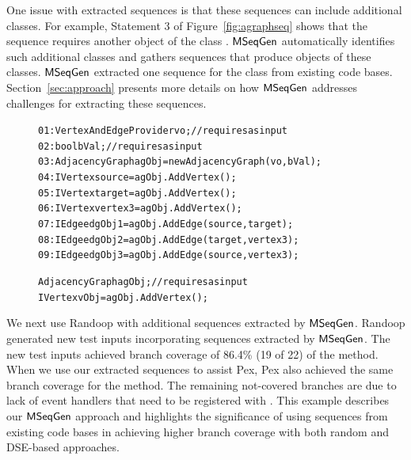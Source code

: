 \documentclass{sig-alternate}
\begin{document}
One issue with extracted sequences is that these sequences can include additional classes. For example,
Statement 3 of Figure~\ref{fig:agraphseq} shows that the  sequence requires another object of the class . $\textsf{MSeqGen} $ automatically identifies such additional classes and gathers sequences that produce objects of these classes. $\textsf{MSeqGen} $ extracted one  sequence for the  class from existing code bases. Section~\ref{sec:approach} presents more details on how $\textsf{MSeqGen} $ addresses challenges for extracting these sequences.

\begin{figure}[t]
\begin{CodeOut}
\begin{alltt}
01: VertexAndEdgeProvider vo; //requires as input
02: bool bVal; //requires as input
03: AdjacencyGraph agObj = new AdjacencyGraph(vo,bVal); 
04: IVertex source = agObj.AddVertex();
05: IVertex target = agObj.AddVertex();
06: IVertex vertex3 = agObj.AddVertex();
07: IEdge edgObj1 = agObj.AddEdge(source,target); 
08: IEdge edgObj2 = agObj.AddEdge(target,vertex3);
09: IEdge edgObj3 = agObj.AddEdge(source,vertex3);
\end{alltt}
\end{CodeOut}\vspace*{-4ex}
\vspace*{-2ex}
\end{figure}
\begin{figure}[t]
\begin{CodeOut}
\begin{alltt}
AdjacencyGraph agObj; //requires as input
IVertex vObj = agObj.AddVertex();
\end{alltt}
\end{CodeOut}\vspace*{-4ex}
\vspace*{-4ex}
\end{figure}

We next use Randoop with additional sequences extracted by $\textsf{MSeqGen} $. Randoop generated new test inputs incorporating  sequences extracted by $\textsf{MSeqGen} $. The new test inputs achieved branch coverage of 86.4\% (19 of 22) of the  method. When we use our extracted sequences to assist Pex, Pex also achieved the same branch coverage for the  method. The remaining not-covered branches are due to lack of event handlers that need to be registered with . This example describes our $\textsf{MSeqGen} $ approach and highlights the significance of using sequences from existing code bases in achieving higher branch coverage with both random and DSE-based approaches.
\end{document}
